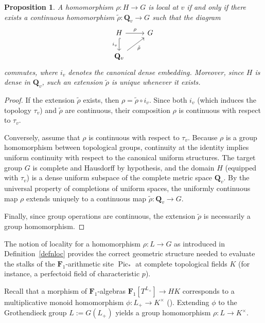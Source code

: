 \documentclass[11pt,a4paper]{article}
\newtheorem{proposition}[theorem]{Proposition}
\newcommand{\Q}{\mathbf{Q}}
\newcommand{\Fone}{\mathbf{F}_{1}}
\newcommand{\Pic}{\operatorname{Pic}} \newcommand{\Jac}{\operatorname{Jac}}
\newcommand{\picone}{{\Pic}_{*}}
\begin{document}
\begin{proposition}
A homomorphism $\rho: H \to G$ is local at $v$ 
if and only if there exists a continuous homomorphism 
$\tilde{\rho}: \Q_v \to G$ such that the diagram
\[
\begin{tikzcd}
H \arrow[r, "\rho"] \arrow[d, "i_v"', hook] & G \\
\Q_v \arrow[ru, "\tilde{\rho}"'] &
\end{tikzcd}
\]
commutes, where $i_v$ denotes the canonical dense embedding. 
Moreover, since $H$ is dense in $\Q_v$, such an extension 
$\tilde{\rho}$ is unique whenever it exists.
\end{proposition}

\begin{proof}
If the extension $\tilde{\rho}$ exists, then 
$\rho = \tilde{\rho} \circ i_v$. 
Since both $i_v$ (which induces the topology $\tau_v$) 
and $\tilde{\rho}$ are continuous, their composition 
$\rho$ is continuous with respect to $\tau_v$.

Conversely, assume that $\rho$ is continuous with respect 
to $\tau_v$. Because $\rho$ is a group homomorphism between 
topological groups, continuity at the identity implies 
uniform continuity with respect to the canonical uniform 
structures. The target group $G$ is complete and Hausdorff 
by hypothesis, and the domain $H$ (equipped with $\tau_v$) 
is a dense uniform subspace of the complete metric space 
$\Q_v$. By the universal property of completions of uniform 
spaces, the uniformly continuous map $\rho$ extends uniquely 
to a continuous map 
$\tilde{\rho}: \Q_v \to G$. 

Finally, since group operations are continuous, 
the extension $\tilde{\rho}$ is necessarily a group 
homomorphism.
\end{proof}

The notion of locality for a homomorphism 
$\rho: L \to G$ as introduced in 
Definition~\ref{defnloc} provides the correct 
geometric structure needed to evaluate the stalks 
of the $\Fone$-arithmetic site $\picone$ at complete topological fields 
$K$ (for instance, a perfectoid field of characteristic $p$).

Recall that a morphism of $\Fone$-algebras 
$\Fone[T^{L_+}]\to HK$ corresponds to a multiplicative 
monoid homomorphism 
$\phi: L_+ \to K^\times$ (\cite[Proposition 2.2]{CC4}). 
Extending $\phi$ to the Grothendieck group $L:=G(L_+)$ 
yields a group homomorphism 
$\rho:L \to K^\times$.\vspace{.03in}
\end{document}
